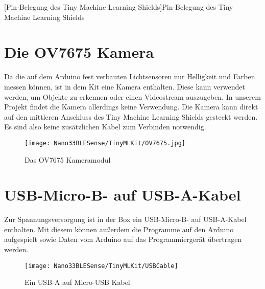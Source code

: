 \begin{center}
    
    [Pin-Belegung des Tiny Machine Learning Shields]{Pin-Belegung des Tiny Machine Learning Shields \cite{ArduinoShield:2021}}\label{TinyMachineLearningShieldPins}
\end{center}





\section{Die OV7675 Kamera}

Da die auf dem Arduino fest verbauten Lichtsensoren nur Helligkeit und Farben messen können, ist in dem Kit eine Kamera enthalten. Diese kann verwendet werden, um Objekte zu erkennen oder einen Videostream auszugeben. In unserem Projekt findet die Kamera allerdings keine Verwendung.\newline
Die Kamera kann direkt auf den mittleren Anschluss des Tiny Machine Learning Shields gesteckt werden. Es sind also keine zusätzlichen Kabel zum Verbinden notwendig. 

\begin{figure}[H]
    \centering
    \texttt{[image: Nano33BLESense/TinyMLKit/OV7675.jpg]}
    \caption[Das OV7675 Kameramodul]{Das OV7675 Kameramodul \cite{ArduinoKit:2022}}
\end{figure}


\section{USB-Micro-B- auf USB-A-Kabel}

Zur Spannungsversorgung ist in der Box ein USB-Micro-B- auf USB-A-Kabel enthalten. Mit diesem können außerdem die Programme auf den Arduino aufgespielt sowie Daten vom Arduino auf das Programmiergerät übertragen werden.

\begin{figure}[H]
    \centering
    \texttt{[image: Nano33BLESense/TinyMLKit/USBCable]}
    \caption{Ein USB-A auf Micro-USB Kabel}
\end{figure}


